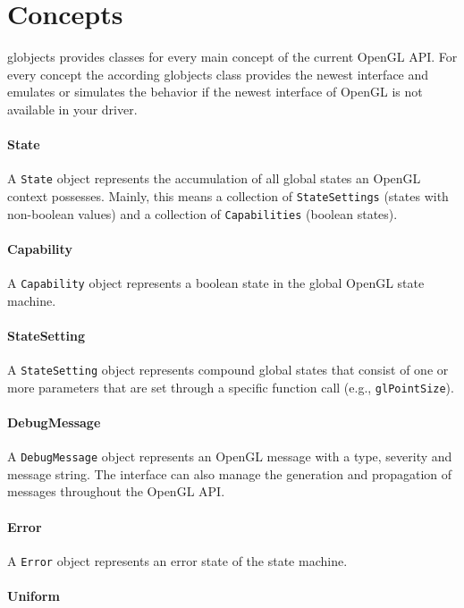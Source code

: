 \documentclass{article}
\begin{document}
\section{Concepts}

globjects provides classes for every main concept of the current OpenGL API. For every concept the according globjects class provides the newest interface and emulates or simulates the behavior if the newest interface of OpenGL is not available in your driver.

\paragraph{State}
A \lstinline|State| object represents the accumulation of all global states an OpenGL context possesses. Mainly, this means a collection of \lstinline|StateSettings| (states with non-boolean values) and a collection of \lstinline|Capabilities| (boolean states).

\paragraph{Capability}
A \lstinline|Capability| object represents a boolean state in the global OpenGL state machine.

\paragraph{StateSetting}

A \lstinline|StateSetting| object represents compound global states that consist of one or more parameters that are set through a specific function call (e.g., \lstinline|glPointSize|).

\paragraph{DebugMessage}

A \lstinline|DebugMessage| object represents an OpenGL message with a type, severity and message string. The interface can also manage the generation and propagation of messages throughout the OpenGL API.

\paragraph{Error}

A \lstinline|Error| object represents an error state of the state machine.

\paragraph{Uniform}
\end{document}
